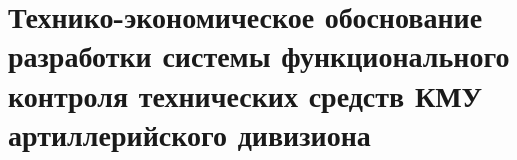 \newcommand{\byr}{руб}

\section{Технико-экономическое обоснование разработки системы функционального контроля технических средств КМУ
артиллерийского дивизиона}





\FPeval{\leadDevPerHourExact}{\leadDevPerMonth / \normativeManHours}
\FPeval{\devPerHourExact}{\devPerMonth / \normativeManHours}
\FPeval{\qaPerHourExact}{\qaPerMonth / \normativeManHours}


\FPeval{\leadDevSalaryExact}{\leadDevHours * \leadDevPerHourExact}
\FPeval{\devSalaryExact}{\devHours * \devPerHourExact}
\FPeval{\qaSalaryExact}{\qaHours * \qaPerHourExact}








\FPeval{\totalExpensesExact}{\totalSalary + \extraSalary + \socialFees + \extraFees}

